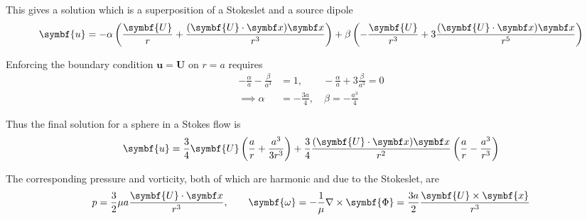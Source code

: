 \documentclass{jknotes}
\begin{document}
This gives a solution which is a superposition of a Stokeslet and a source
dipole
\begin{equation}
	\symbf{u} = -\alpha \left( \frac{\symbf{U}}{r} +
		\frac{(\symbf{U}\cdot\x)\x}{r^3}\right) + \beta \left(
	-\frac{\symbf{U}}{r^3} + 3 \frac{(\symbf{U}\cdot\x)\x}{r^5}\right)
\end{equation}

Enforcing the boundary condition $\symbf{u} = \symbf{U}$ on $r=a$ requires
\begin{equation}
	\begin{aligned}
		-\frac{\alpha}{a} - \frac{\beta}{a^3} &= 1, \hspace{2em}
		-\frac{\alpha}{a} + 3 \frac{\beta}{a^3} = 0 \\
		\implies \alpha &= -\frac{3a}{4}, \hspace{1em} \beta = -\frac{a^3}{4}
	\end{aligned}
\end{equation}

Thus the final solution for a sphere in a Stokes flow is
\begin{equation}
	\symbf{u} = \frac{3}{4}\symbf{U}\left(\frac{a}{r} + \frac{a^3}{3r^3} \right) +
	\frac{3}{4} \frac{(\symbf{U}\cdot\x)\x}{r^2} \left( \frac{a}{r} -
	\frac{a^3}{r^3}\right)
\end{equation}

The corresponding pressure and vorticity, both of which are harmonic and due
to the Stokeslet, are
\begin{equation}
	p = \frac{3}{2}\mu a \frac{\symbf{U}\cdot\x}{r^3}, \hspace{2em}\symbf{\omega} =
	-\frac{1}{\mu} \nabla \times \symbf{\Phi} = \frac{3a}{2}\frac{\symbf{U} \times
	\symbf{x}}{r^3}
\end{equation}

\end{document}
